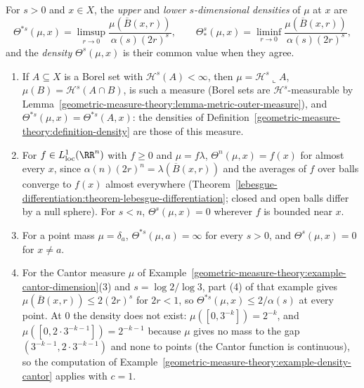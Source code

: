 \begin{definition}\label{geometric-measure-theory:definition-measure-density}
For $s > 0$ and $x \in X$, the \emph{upper} and \emph{lower $s$-dimensional densities} of $\mu$ at $x$ are
\[
\Theta^{*s}(\mu, x) = \limsup_{r \to 0}\frac{\mu(\overline{B}(x, r))}{\alpha(s)(2r)^s}, \qquad \Theta^s_*(\mu, x) = \liminf_{r \to 0}\frac{\mu(\overline{B}(x, r))}{\alpha(s)(2r)^s},
\]
and the \emph{density} $\Theta^s(\mu, x)$ is their common value when they agree.
\end{definition}

\begin{example}\label{geometric-measure-theory:example-measure-density}
\begin{enumerate}
\item If $A \subseteq X$ is a Borel set with $\mathcal{H}^s(A) < \infty$, then $\mu = \mathcal{H}^s\llcorner A$, $\mu(B) = \mathcal{H}^s(A \cap B)$, is such a measure (Borel sets are
$\mathcal{H}^s$-measurable by Lemma~\ref{geometric-measure-theory:lemma-metric-outer-measure}), and $\Theta^{*s}(\mu, x) = \Theta^{*s}(A, x)$: the densities of Definition~\ref{geometric-measure-theory:definition-density} are those
of this measure.
\item For $f \in L^1_{\mathrm{loc}}(\RR^n)$ with $f \geq 0$ and $\mu = f\lambda$, $\Theta^n(\mu, x) = f(x)$ for almost every $x$, since $\alpha(n)(2r)^n = \lambda(\overline{B}(x, r))$ and the averages of $f$ over balls
converge to $f(x)$ almost everywhere (Theorem~\ref{lebesgue-differentiation:theorem-lebesgue-differentiation}; closed and open balls differ by a null sphere). For $s < n$, $\Theta^s(\mu, x) = 0$ wherever $f$ is
bounded near $x$.
\item For a point mass $\mu = \delta_a$, $\Theta^{*s}(\mu, a) = \infty$ for every $s > 0$, and $\Theta^s(\mu, x) = 0$ for $x \neq a$.
\item For the Cantor measure $\mu$ of Example~\ref{geometric-measure-theory:example-cantor-dimension}(3) and $s = \log 2/\log 3$, part (4) of that example gives $\mu(\overline{B}(x, r)) \leq 2(2r)^s$ for $2r < 1$, so
$\Theta^{*s}(\mu, x) \leq 2/\alpha(s)$ at every point. At $0$ the density does not exist: $\mu([0, 3^{-k}]) = 2^{-k}$, and $\mu([0, 2 \cdot 3^{-k-1}]) = 2^{-k-1}$ because $\mu$ gives no
mass to the gap $(3^{-k-1}, 2 \cdot 3^{-k-1})$ and none to points (the Cantor function is continuous), so the computation of Example~\ref{geometric-measure-theory:example-density-cantor} applies with $c = 1$.
\end{enumerate}
\end{example}

